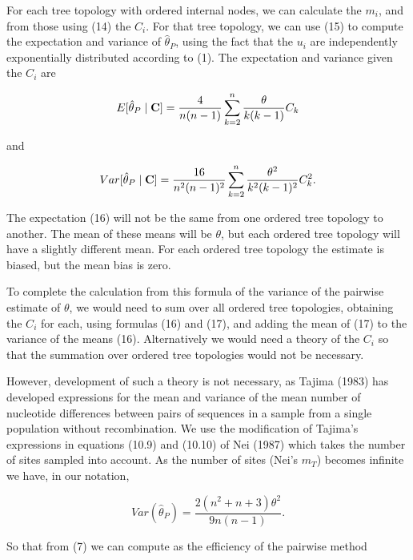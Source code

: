 For each tree topology with ordered internal nodes, we can calculate
the $m_i$, and from those using (14) the $C_i$.   For that tree topology,
we can use (15) to compute the expectation and variance of $\hat{\theta}_P$, using
the fact that the $u_i$ are independently exponentially distributed
according to (1).  The expectation and variance given the $C_i$ are

\begin{equation} %
  E[\hat{\theta}_{P} \mid {\bf C}]  =  \frac{4}{n (n-1)} \sum\limits_{k=2}^n
\frac{\theta}{k(k-1)} C_k
\end{equation}

and

\begin{equation} %
  Var [\hat{\theta}_{P} \mid {\bf C}]  = \frac{16}{n^2 (n-1)^2} \sum\limits_{k=2}^n
\frac{\theta^2}{k^2 (k-1)^2} C_k^2.
\end{equation}

The expectation (16) will not be the same from one ordered tree topology to
another.  The mean of these means will be $\theta$, but each ordered tree
topology will have a slightly different mean.  For each ordered tree
topology the estimate is biased, but the mean bias is zero.

To complete the calculation from this formula of the variance of the pairwise
estimate of $\theta$, we would need to sum over all ordered tree topologies,
obtaining the
$C_i$ for each, using formulas (16) and (17), and adding the mean of
(17) to the variance of the means (16).  Alternatively we would need a
theory of the $C_i$ so that the summation over ordered tree topologies
would not be necessary.

However, development of such a theory is not necessary, as Tajima (1983)
has developed expressions for the mean and variance of the mean number of
nucleotide differences between pairs of sequences in a sample from a
single population without recombination.  We use the
modification of Tajima's expressions in equations (10.9) and (10.10)
of Nei (1987) which takes the number of sites sampled into account.  As
the number of sites (Nei's $m_{T}$) becomes infinite we have, in our
notation,

\begin{equation} %
Var(\hat{\theta}_P) = \frac{2(n^2+n+3)\theta^2}{9n(n-1)}.
\end{equation}

So that from (7) we can compute as the efficiency of the pairwise
method

